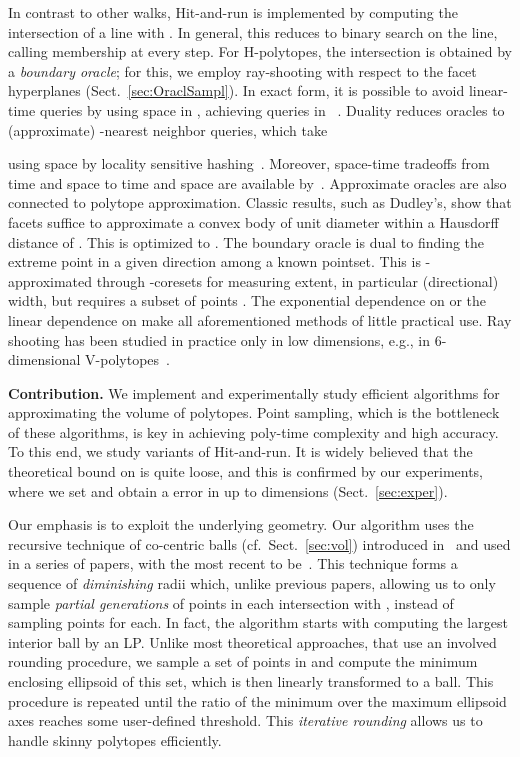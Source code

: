 \documentclass[11pt,a4paper]{article}
\begin{document}
In contrast to other walks, Hit-and-run is implemented by 
computing the intersection of a line with .  
In general, this reduces to binary search on the line,
calling membership at every step. 
For H-polytopes, the intersection is obtained by a {\em boundary oracle};
for this, we employ ray-shooting with respect to
the  facet hyperplanes (Sect.~\ref{sec:OraclSampl}).
In exact form, it is possible to avoid linear-time queries by using space in ,
achieving queries in ~\cite{Ramos99}.
Duality reduces oracles to (approximate) -nearest neighbor
queries, which take 

using  space by locality sensitive hashing~\cite{Andoni08}.
Moreover, space-time tradeoffs from  time
and  space to  time and 
 space are available by~\cite{AryaFonsMoun12socg}.
Approximate oracles are also connected to polytope approximation.
Classic results, such as Dudley's, show that  facets suffice to approximate a convex body of unit diameter
within a Hausdorff distance of .
This is optimized to  \cite{AryaFonsMoun12socg}.
The boundary oracle is dual to finding the extreme point in
a given direction among a known pointset.
This is -approximated through -coresets
for measuring extent, in particular (directional) width, but requires
a subset of  points
\cite{AgarwalHPVa05}.  
The exponential dependence on  or the linear dependence on 
make all aforementioned methods of little practical use.
Ray shooting has been studied in practice only in low dimensions,
e.g., in 6-dimensional V-polytopes~\cite{ZhenYaman13}. 

\textbf{Contribution.}
We implement and experimentally study efficient algorithms for approximating
the volume of polytopes. Point sampling, which is the bottleneck of these algorithms,
is key in achieving poly-time complexity and high accuracy.
To this end, we study variants of Hit-and-run. 
It is widely believed that the theoretical bound on  is quite loose,
and this is confirmed by our experiments, where we set 
and obtain a  error in up to  dimensions (Sect.~\ref{sec:exper}).  

Our emphasis is to exploit the underlying geometry.
Our algorithm uses the recursive technique of co-centric balls (cf.\ Sect.~\ref{sec:vol}) introduced in~\cite{DyerFrKa91} and used in a series of papers, with the most recent to be~\cite{KannanLS97}.  
This technique forms a sequence of {\em diminishing} radii
which, unlike previous papers, allowing us to only sample {\em partial generations} of points in each intersection with , instead of sampling  points for each.
In fact, the algorithm starts with computing the largest interior ball by an LP.
Unlike most theoretical approaches, that use an involved rounding procedure,
we sample a set of points in  and compute the minimum enclosing ellipsoid of this set, which is then linearly transformed to a ball. This procedure  is repeated until the ratio of the minimum over the maximum ellipsoid axes reaches some user-defined threshold. This {\em iterative rounding} allows us to handle skinny polytopes efficiently.
\end{document}
